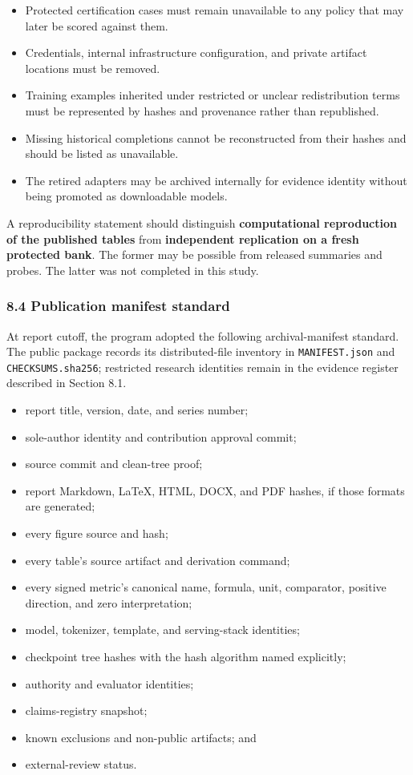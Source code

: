 \documentclass[
]{article}
\providecommand{\tightlist}{%
  \setlength{\itemsep}{0pt}\setlength{\parskip}{0pt}}
\begin{document}
\begin{itemize}
\tightlist
\item
  Protected certification cases must remain unavailable to any policy
  that may later be scored against them.
\item
  Credentials, internal infrastructure configuration, and private
  artifact locations must be removed.
\item
  Training examples inherited under restricted or unclear redistribution
  terms must be represented by hashes and provenance rather than
  republished.
\item
  Missing historical completions cannot be reconstructed from their
  hashes and should be listed as unavailable.
\item
  The retired adapters may be archived internally for evidence identity
  without being promoted as downloadable models.
\end{itemize}

A reproducibility statement should distinguish \textbf{computational
reproduction of the published tables} from \textbf{independent
replication on a fresh protected bank}. The former may be possible from
released summaries and probes. The latter was not completed in this
study.

\subsubsection{8.4 Publication manifest
standard}\label{84-publication-manifest-standard}

At report cutoff, the program adopted the following archival-manifest
standard. The public package records its distributed-file inventory in
\texttt{MANIFEST.json} and \texttt{CHECKSUMS.sha256}; restricted
research identities remain in the evidence register described in Section
8.1.

\begin{itemize}
\tightlist
\item
  report title, version, date, and series number;
\item
  sole-author identity and contribution approval commit;
\item
  source commit and clean-tree proof;
\item
  report Markdown, LaTeX, HTML, DOCX, and PDF hashes, if those formats
  are generated;
\item
  every figure source and hash;
\item
  every table's source artifact and derivation command;
\item
  every signed metric's canonical name, formula, unit, comparator,
  positive direction, and zero interpretation;
\item
  model, tokenizer, template, and serving-stack identities;
\item
  checkpoint tree hashes with the hash algorithm named explicitly;
\item
  authority and evaluator identities;
\item
  claims-registry snapshot;
\item
  known exclusions and non-public artifacts; and
\item
  external-review status.
\end{itemize}
\end{document}
